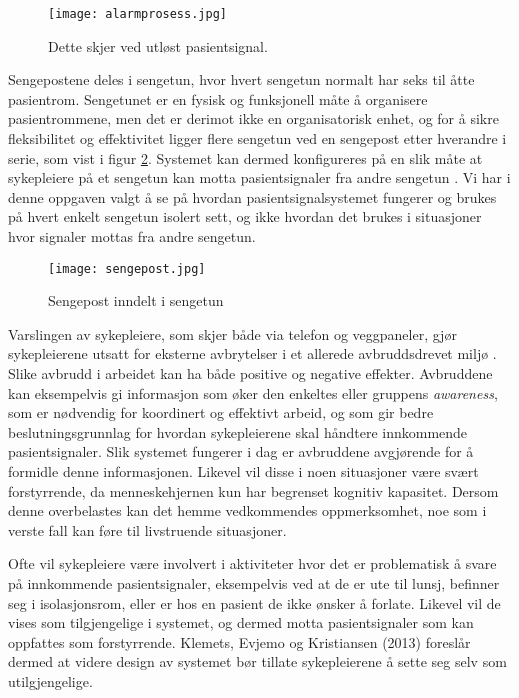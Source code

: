 \begin{figure}[H]
\centering
\texttt{[image: alarmprosess.jpg]}
\caption{Dette skjer ved utløst pasientsignal.}
\label{fig:detteskjer}
\end{figure}

\noindent
Sengepostene deles i sengetun, hvor hvert sengetun normalt har seks til åtte pasientrom. Sengetunet er en fysisk og funksjonell måte å organisere pasientrommene, men det er derimot ikke en organisatorisk enhet, og for å sikre fleksibilitet og effektivitet ligger flere sengetun ved en sengepost etter hverandre i serie, som vist i figur \ref{fig:sengepost}. Systemet kan dermed konfigureres på en slik måte at sykepleiere på et sengetun kan motta pasientsignaler fra andre sengetun \cite{Aslaksen}. Vi har i denne oppgaven valgt å se på hvordan pasientsignalsystemet fungerer og brukes på hvert enkelt sengetun isolert sett, og ikke hvordan det brukes i situasjoner hvor signaler mottas fra andre sengetun.

\begin{figure}[H]
\centering
\texttt{[image: sengepost.jpg]}
\caption{Sengepost inndelt i sengetun \cite{Aslaksen}}
\label{fig:sengepost}
\end{figure}

\noindent
Varslingen av sykepleiere, som skjer både via telefon og veggpaneler, gjør sykepleierene utsatt for eksterne avbrytelser i et allerede avbruddsdrevet miljø \cite{Klemets12}. Slike avbrudd i arbeidet kan ha både positive og negative effekter. Avbruddene kan eksempelvis gi informasjon som øker den enkeltes eller gruppens \emph{awareness}, som er nødvendig for koordinert og effektivt arbeid, og som gir bedre beslutningsgrunnlag for hvordan sykepleierene skal håndtere innkommende pasientsignaler. Slik systemet fungerer i dag er avbruddene avgjørende for å formidle denne informasjonen. Likevel vil disse i noen situasjoner være svært forstyrrende, da menneskehjernen kun har begrenset kognitiv kapasitet. Dersom denne overbelastes kan det hemme vedkommendes oppmerksomhet, noe som i verste fall kan føre til livstruende situasjoner. 

\noindent
Ofte vil sykepleiere være involvert i aktiviteter hvor det er problematisk å svare på innkommende pasientsignaler, eksempelvis ved at de er ute til lunsj, befinner seg i isolasjonsrom, eller er hos en pasient de ikke ønsker å forlate. Likevel vil de vises som tilgjengelige i systemet, og dermed motta pasientsignaler som kan oppfattes som forstyrrende. Klemets, Evjemo og Kristiansen (2013) foreslår dermed at videre design av systemet bør tillate sykepleierene å sette seg selv som utilgjengelige. 

